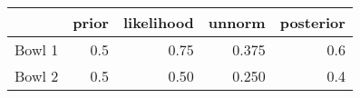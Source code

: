 \begin{tabular}{lrrrr}
\toprule
{} &  prior &  likelihood &  unnorm &  posterior \\
\midrule
Bowl 1 &    0.5 &        0.75 &   0.375 &        0.6 \\
Bowl 2 &    0.5 &        0.50 &   0.250 &        0.4 \\
\bottomrule
\end{tabular}
